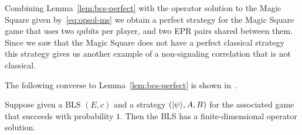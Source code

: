 Combining Lemma~\ref{lem:bcs-perfect} with the operator solution to the Magic Square given by~\eqref{eq:opsol-ms} we obtain a perfect strategy for the Magic Square game that uses two qubits per player, and two EPR pairs shared between them. Since we saw that the Magic Square does not have a perfect classical strategy this strategy gives us another example of a non-signaling correlation that is not classical. 

The following converse to Lemma~\ref{lem:bcs-perfect} is shown in~\cite{cleve2014characterization}. 

\begin{lemma}\label{lem:bcs-tensor}
Suppose given a BLS $(E,c)$ and a strategy $(|\psi\rangle,A,B)$ for the associated game that succeeds with probability $1$. Then the BLS has a finite-dimensional operator solution. 
\end{lemma}

